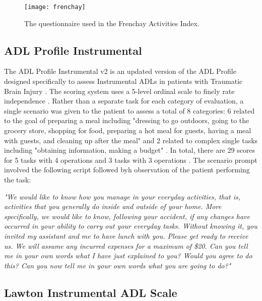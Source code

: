 \begin{figure}[ht]
    \centering
    \texttt{[image: frenchay]}
    \caption{The questionnaire used in the Frenchay Activities Index.}
    \label{fig:frenchay}
\end{figure}

\clearpage
\subsection{ADL Profile Instrumental}
The ADL Profile Instrumental v2 is an updated version of the ADL Profile designed specifically to assess Instrumental ADLs in patients with Traumatic Brain Injury \cite{bottari_iadl_2010}. The scoring system uses a 5-level ordinal scale to finely rate independence \cite{bottari_iadl_2010}. Rather than a separate task for each category of evaluation, a single scenario was given to the patient to assess a total of 8 categories: 6 related to the goal of preparing a meal including "dressing to go outdoors, going to the grocery store, shopping for food, preparing a hot meal for guests, having a meal with guests, and cleaning up after the meal" and 2 related to complex single tasks including "obtaining information, making a budget" \cite{bottari_iadl_2010}. In total, there are 29 scores for 5 tasks with 4 operations and 3 tasks with 3 operations \cite{bottari_iadl_2010}. The scenario prompt involved the following script followed byh observation of the patient performing the task:

\begin{displayquote}
    \textit{"We would like to know how you manage in your everyday activities, that is, activities that  you  generally  do  inside and outside  of  your  home. More specifically, we would like to know, following your accident, if any changes have occurred in your ability to carry out your everyday tasks. Without knowing it, you invited my assistant and me to have lunch with you. Please get ready to receive us. We will assume any incurred expenses for a maximum of \$20. Can you tell me in your own words what I have just explained to you? Would you agree to do this? Can you now tell me in your own words what you are going to do?"} \cite{bottari_iadl_2010}
\end{displayquote}



\clearpage
\subsection{Lawton Instrumental ADL Scale}
\clearpage
